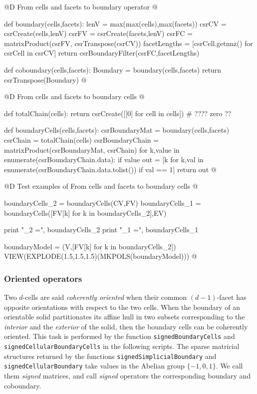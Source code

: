 \documentclass[11pt,oneside]{article}	%
\begin{document}
@D From cells and facets to boundary operator
@{def boundary(cells,facets):
	lenV = max(max(cells),max(facets))
	csrCV = csrCreate(cells,lenV)
	csrFV = csrCreate(facets,lenV)
	csrFC = matrixProduct(csrFV, csrTranspose(csrCV))
	facetLengths = [csrCell.getnnz() for csrCell in csrCV]
	return csrBoundaryFilter(csrFC,facetLengths)

def coboundary(cells,facets):
	Boundary = boundary(cells,facets)
	return csrTranspose(Boundary)
@}
@D From cells and facets to boundary cells
@{def totalChain(cells):
	return csrCreate([[0] for cell in cells])  # ????  zero ??

def boundaryCells(cells,facets):
	csrBoundaryMat = boundary(cells,facets)
	csrChain = totalChain(cells)
	csrBoundaryChain = matrixProduct(csrBoundaryMat, csrChain)
	for k,value in enumerate(csrBoundaryChain.data):
		if value %
	out = [k for k,val in enumerate(csrBoundaryChain.data.tolist()) if val == 1]
	return out
@}
@D Test examples of From cells and facets to boundary cells
@{boundaryCells_2 = boundaryCells(CV,FV)
boundaryCells_1 = boundaryCells([FV[k] for k in boundaryCells_2],EV)

print "\nboundaryCells_2 =\n", boundaryCells_2
print "\nboundaryCells_1 =\n", boundaryCells_1

boundaryModel = (V,[FV[k] for k in boundaryCells_2])
VIEW(EXPLODE(1.5,1.5,1.5)(MKPOLS(boundaryModel)))
@}



\subsubsection{Oriented operators}

Two $d$-cells are said \emph{coherently oriented} when their common $(d-1)$-facet has opposite orientations with respect to the two cells. When the boundary of an orientable solid partitionates its affine hull in two subsets corresponding to the \emph{interior} and the \emph{exterior} of the solid, then the boundary cells can be coherently oriented. This task is performed by the function \texttt{signedBoundaryCells} and \texttt{signedCellularBoundaryCells} in the following scripts.
The sparse matricial structures returned by the functions \texttt{signedSimplicialBoundary} and \texttt{signedCellularBoundary} take values in the Abelian group $\{-1,0,1\}$. We call them \emph{signed} matrices, and call \emph{signed} operators the corresponding boundary and coboundary.
\end{document}
